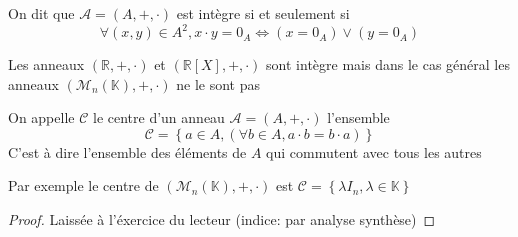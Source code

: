 \documentclass[11pt,colorlinks]{book}
\theoremstyle{mytheoremstyle}
\theoremstyle{mytheoremstyle}
\theoremstyle{mytheoremstyle}
\theoremstyle{mytheoremstyle}
\theoremstyle{mytheoremstyle}
\theoremstyle{mytheoremstyle}
\theoremstyle{mytheoremstyle}
\theoremstyle{mytheoremstyle}
\theoremstyle{myproblemstyle}
\def\mbb#1{\mathbb{#1}}
\def\bR{\mbb{R}}
\def\bK{\mbb{K}}
\begin{document}
\begin{definition}
  On dit que $\mathcal A = (A,+,\cdot)$ est intègre si et seulement si 
  \begin{equation*}
    \forall (x,y) \in A^2, x \cdot y = 0_A \Leftrightarrow (x = 0_A) \vee (y = 0_A)
  \end{equation*}
\end{definition}
\begin{ex}
  Les anneaux $(\bR,+,\cdot)$ et $(\bR[X],+,\cdot)$ sont intègre mais dans le cas général les anneaux $(\mathcal M_n(\bK),+,\cdot)$ 
  ne le sont pas
\end{ex}
\begin{definition}
  On appelle $\mathcal C $ le centre d'un anneau $\mathcal A = (A,+,\cdot)$ l'ensemble 
  \begin{equation*}
    \mathcal C = \left\{a \in A, (\forall b \in A, a \cdot b = b \cdot a)\right\}
  \end{equation*}
  C'est à dire l'ensemble des éléments de $A$ qui commutent avec tous les autres
\end{definition}
\begin{ex}
  Par exemple le centre de $(\mathcal M_n(\bK),+,\cdot)$ est $\mathcal C = \left\{\lambda I_n, \lambda \in \bK\right\}$
  \begin{proof}
    Laissée à l'éxercice du lecteur (indice: par analyse synthèse)
  \end{proof}
\end{ex}
\end{document}
